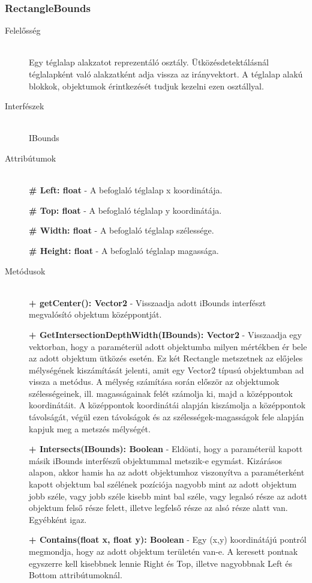 \subsubsection{RectangleBounds}
	\begin{description}
		\item[Felelősség] \hfill \\
		Egy téglalap alakzatot reprezentáló osztály. Ütközésdetektálásnál téglalapként való alakzatként adja vissza az irányvektort. A téglalap alakú blokkok, objektumok érintkezését tudjuk kezelni ezen osztállyal.

		\item[Interfészek] \hfill \\
		IBounds

		\item[Attribútumok] \hfill \\
		\textbf{\# Left: float} - A befoglaló téglalap x koordinátája.
		
		\textbf{\# Top: float} - A befoglaló téglalap y koordinátája.
		
		\textbf{\# Width: float} - A befoglaló téglalap szélessége.
		
		\textbf{\# Height: float} - A befoglaló téglalap magassága.
		
		\item[Metódusok]\hfill \\
		\textbf{+ getCenter(): Vector2} - Visszaadja adott iBounds interfészt megvalósító objektum középpontját.
		
		\textbf{+ GetIntersectionDepthWidth(IBounds): Vector2} - Visszaadja egy vektorban, hogy a paraméterül adott objektumba milyen mértékben ér bele az adott objektum ütközés esetén. Ez két Rectangle metszetnek az előjeles mélységének kiszámítását jelenti, amit egy Vector2 típusú objektumban ad vissza a metódus. A mélység számítása során először az objektumok szélességeinek, ill. magasságainak felét számolja ki, majd a középpontok koordinátáit. A középpontok koordinátái alapján kiszámolja a középpontok távolságát, végül ezen távolságok és az szélességek-magasságok fele alapján kapjuk meg a metszés mélységét.
		
		\textbf{+ Intersects(IBounds): Boolean} - Eldönti, hogy a paraméterül kapott másik iBounds interfészű objektummal metszik-e egymást. Kizárásos alapon, akkor hamis ha az adott objektumhoz viszonyítva a paraméterként kapott objektum bal szélének pozíciója nagyobb mint az adott objektum jobb széle, vagy jobb széle kisebb mint bal széle, vagy legalsó része az adott objektum felső része felett, illetve legfelső része az alsó része alatt van. Egyébként igaz.
		
		\textbf{+ Contains(float x, float y): Boolean} - Egy (x,y) koordinátájú pontról megmondja, hogy az adott objektum területén van-e. A keresett pontnak egyszerre kell kisebbnek lennie Right és Top, illetve nagyobbnak Left és Bottom attribútumoknál.
						
	\end{description}
	
